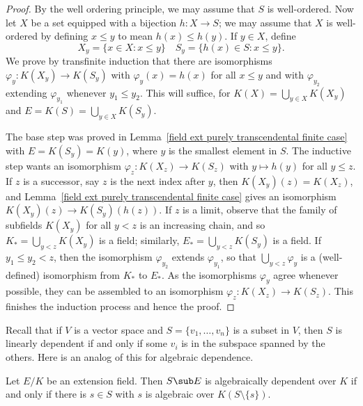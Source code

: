 \begin{proof}
By the well ordering principle, we may assume that $S$ is well-ordered. Now let $X$ be a set equipped with a bijection $h:X\to S$; we may assume that $X$ is well-ordered by defining $x\leq y$ to mean $h(x)\leq h(y)$. If $y\in X$, define
\[X_y=\{x\in X:x\leq y\}\quad S_y=\{h(x)\in S:x\leq y\}.\]
We prove by transfinite induction that there are isomorphisms $\varphi_y:K(X_y)\to K(S_y)$ with $\varphi_y(x)=h(x)$ for all $x\leq y$ and with $\varphi_{y_2}$ extending $\varphi_{y_1}$ whenever $y_1\leq y_2$. This will suffice, for $K(X)=\bigcup_{y\in X}K(X_y)$ and $E=K(S)=\bigcup_{y\in X}K(S_y)$.\par
The base step was proved in Lemma~\ref{field ext purely transcendental finite case} with $E=K(S_y)=K(y)$, where $y$ is the smallest element in $S$. The inductive step wants an isomorphism $\varphi_z:K(X_z)\to K(S_z)$ with $y\mapsto h(y)$ for all $y\leq z$. If $z$ is a successor, say $z$ is the next index after $y$, then $K(X_y)(z)=K(X_z)$, and Lemma~\ref{field ext purely transcendental finite case} gives an isomorphism $K(X_y)(z)\to K(S_y)(h(z))$. If $z$ is a limit, observe that the family of subfields $K(X_y)$ for all $y<z$ is an increasing chain, and so $K_*=\bigcup_{y<z}K(X_y)$ is a field; similarly, $E_*=\bigcup_{y< z}K(S_y)$ is a field. If $y_1\leq y_2<z$, then the isomorphism $\varphi_{y_2}$ extends $\varphi_{y_1}$, so that $\bigcup_{y<z}\varphi_y$ is a (well-defined) isomorphism from $K_*$ to $E_*$. As the isomorphisms $\varphi_y$ agree whenever possible, they can be assembled to an isomorphism $\varphi_z:K(X_z)\to K(S_z)$. This finishes the induction process and hence the proof.
\end{proof}
Recall that if $V$ is a vector space and $S=\{v_1,\dots,v_n\}$ is a subset in $V$, then $S$ is linearly dependent if and only if some $v_i$ is in the subspace spanned by the others. Here is an analog of this for algebraic dependence.
\begin{proposition}\label{field ext algebraically dependent iff algebraic on other}
Let $E/K$ be an extension field. Then $S\sub E$ is algebraically dependent over $K$ if and only if there is $s\in S$ with $s$ is algebraic over $K(S\setminus\{s\})$.
\end{proposition}
